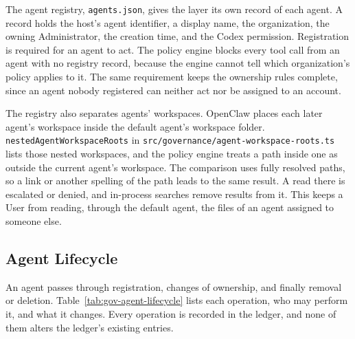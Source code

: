 The agent registry, \texttt{agents.json}, gives the layer its own record
of each agent. A record holds the host's agent identifier, a display name,
the organization, the owning Administrator, the creation time, and the
Codex permission. Registration is required for an agent to act. The policy
engine blocks every tool call from an agent with no registry record,
because the engine cannot tell which organization's policy applies to it.
The same requirement keeps the ownership rules complete, since an agent
nobody registered can neither act nor be assigned to an account.

The registry also separates agents' workspaces. OpenClaw places each later
agent's workspace inside the default agent's workspace folder.
\texttt{nestedAgentWorkspaceRoots} in
\texttt{src/governance/agent-workspace-roots.ts} lists those nested
workspaces, and the policy engine treats a path inside one as outside the
current agent's workspace. The comparison uses fully resolved paths, so a
link or another spelling of the path leads to the same result. A read
there is escalated or denied, and in-process searches remove results from
it. This keeps a User from reading, through the default agent, the files
of an agent assigned to someone else.

\subsection{Agent Lifecycle}
\label{sec:gov-lifecycle}

An agent passes through registration, changes of ownership, and finally
removal or deletion. Table~\ref{tab:gov-agent-lifecycle} lists each
operation, who may perform it, and what it changes. Every operation is
recorded in the ledger, and none of them alters the ledger's existing
entries.

